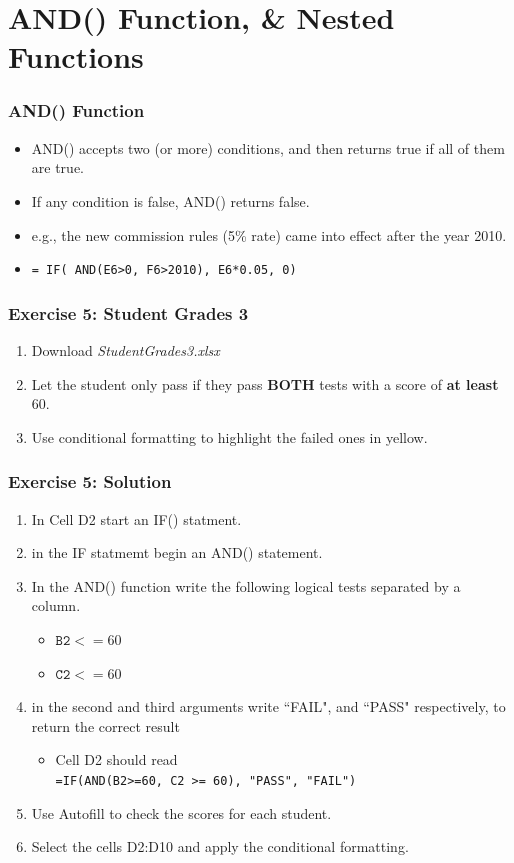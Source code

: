 \documentclass[12pt]{beamer}
\begin{document}
	\section{AND() Function, \& Nested Functions}
	\begin{frame}
	\frametitle{AND() Function}
	\begin{itemize}
	\item AND() accepts two (or more) conditions, and then returns true if all of them are true.
	\item If any condition is false, AND() returns false. 
	\item e.g., the new commission rules (5\% rate)
	came into effect after the year 2010. 
	\item \texttt{= IF( AND(E6>0, F6>2010), E6*0.05, 0)}
	\end{itemize}	
\end{frame}
\begin{frame}
	\frametitle{Exercise 5: Student Grades 3}
	\begin{enumerate}
		\item Download \textit{StudentGrades3.xlsx}
		\item Let the student only pass if they pass \textbf{BOTH} tests with a score of \textbf{at least} 60. 
		\item Use conditional formatting to highlight the failed ones in yellow. 
	\end{enumerate}
\end{frame}
\begin{frame}
	\frametitle{Exercise 5: Solution}
	\begin{enumerate}
		\item In Cell D2 start an IF() statment.
		\item in the IF statmemt begin an AND() statement.
		\item In the AND() function write the following logical tests separated by a column.
		\begin{itemize}
			\item $\texttt{B2}<=60$ \item $\texttt{C2}<=60$
		\end{itemize}
		\item in the second and third arguments write ``FAIL", and ``PASS" respectively, to return the correct result 
		\begin{itemize}
			\item Cell D2 should read\\
			\texttt{=IF(AND(B2>=60, C2 >= 60), "PASS", "FAIL")} 
		\end{itemize}
		\item Use Autofill to check the scores for each student.
		\item Select the cells D2:D10 and apply the conditional formatting.
	\end{enumerate}
\end{frame}
\end{document}
